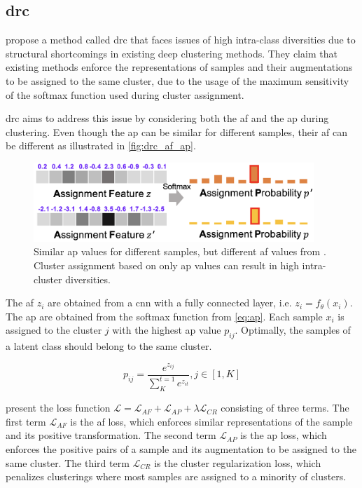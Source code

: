 \subsection{\acl{drc}}\label{subsec:drc}

\citeauthor{DRC_2020} propose a method called \ac{drc} 
that faces issues of high intra-class diversities 
due to structural shortcomings in existing deep clustering methods.
They claim that existing methods enforce the representations of samples 
and their augmentations to be assigned to the same cluster,
due to the usage of the maximum sensitivity of the softmax function used during cluster assignment.

\ac{drc} aims to address this issue by considering both the \ac{af} and the \ac{ap} during clustering.
Even though the \ac{ap} can be similar for different samples, their \ac{af} can be different 
as illustrated in \autoref{fig:drc_af_ap}.

\begin{figure}[h] %
    \centering
    \includegraphics[width=300pt]{images/DRC_af_ap.png}
    \caption{Similar \ac{ap} values for different samples, but different \ac{af} values from \citet{DRC_2020}.
    Cluster assignment based on only \ac{ap} values can result in high intra-cluster diversities.}
    \label{fig:drc_af_ap}
\end{figure}

The \ac{af} $z_i$ are obtained from a \ac{cnn} with a fully connected layer, i.e. $z_i = f_\theta(x_i)$.
The \ac{ap} are obtained from the softmax function from \eqref{eq:ap}. 
Each sample $x_i$ is assigned to the cluster $j$ with the highest \ac{ap} value $p_{ij}$.
Optimally, the samples of a latent class should belong to the same cluster.

\begin{equation}
    p_{ij} = \frac{e^{z_{ij}}}{\sum_{K}^{t=1}e^{z_{it}}}, j \in \left[1,K\right]
    \label{eq:ap}
\end{equation}

\citeauthor{DRC_2020} present the loss function $\mathcal{L} = \mathcal{L}_{AF} + \mathcal{L}_{AP}  + \lambda \mathcal{L}_{CR}$  consisting of three terms.
The first term $\mathcal{L}_{AF}$ is the \ac{af} loss, which enforces similar representations of the sample and its positive transformation.
The second term $\mathcal{L}_{AP}$ is the \ac{ap} loss, which enforces the positive pairs of a sample and its augmentation 
to be assigned to the same cluster.
The third term $\mathcal{L}_{CR}$ is the cluster regularization loss, which penalizes clusterings where most samples are assigned to a minority of clusters.